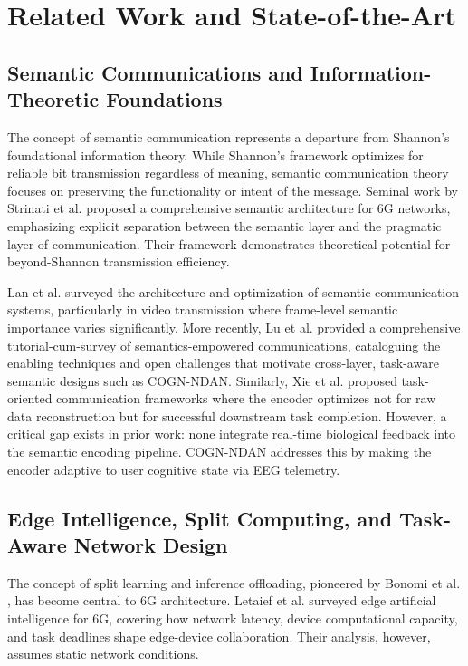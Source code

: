 \documentclass{BVP_CINC}
\newcommand{\COGN}{COGN-NDAN}
\begin{document}
\section{Related Work and State-of-the-Art}

\subsection{Semantic Communications and Information-Theoretic Foundations}
The concept of semantic communication represents a departure from Shannon's foundational information theory. While Shannon's framework optimizes for reliable bit transmission regardless of meaning, semantic communication theory focuses on preserving the functionality or intent of the message. Seminal work by Strinati et al. \cite{strinati2021} proposed a comprehensive semantic architecture for 6G networks, emphasizing explicit separation between the semantic layer and the pragmatic layer of communication. Their framework demonstrates theoretical potential for beyond-Shannon transmission efficiency.

Lan et al. \cite{lan2023semantic} surveyed the architecture and optimization of semantic communication systems, particularly in video transmission where frame-level semantic importance varies significantly. More recently, Lu et al. \cite{lu2024semantics} provided a comprehensive tutorial-cum-survey of semantics-empowered communications, cataloguing the enabling techniques and open challenges that motivate cross-layer, task-aware semantic designs such as \COGN{}. Similarly, Xie et al. \cite{xie2022semantic} proposed task-oriented communication frameworks where the encoder optimizes not for raw data reconstruction but for successful downstream task completion. However, a critical gap exists in prior work: none integrate real-time biological feedback into the semantic encoding pipeline. \COGN{} addresses this by making the encoder adaptive to user cognitive state via EEG telemetry.

\subsection{Edge Intelligence, Split Computing, and Task-Aware Network Design}
The concept of split learning and inference offloading, pioneered by Bonomi et al. \cite{bonomi2012fog}, has become central to 6G architecture. Letaief et al. \cite{letaief2022edge} surveyed edge artificial intelligence for 6G, covering how network latency, device computational capacity, and task deadlines shape edge-device collaboration. Their analysis, however, assumes static network conditions.
\end{document}
